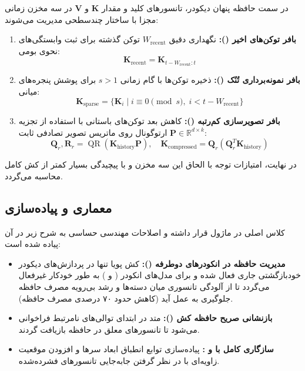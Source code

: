 در سمت حافظه پنهان دیکودر، تانسورهای کلید و مقدار $\mathbf{K}$ و $\mathbf{V}$ در سه مخزن زمانی مجزا با ساختار چندسطحی مدیریت می‌شوند:
\begin{enumerate}
    \item \textbf{بافر توکن‌های اخیر ():} نگهداری دقیق $W_{\text{recent}}$ توکن گذشته برای ثبت وابستگی‌های نحوی بومی:
    \begin{equation}
    \mathbf{K}_{\text{recent}} = \mathbf{K}_{t - W_{\text{recent}} : t}
    \end{equation}
    \item \textbf{بافر نمونه‌برداری تُنُک ():} ذخیره توکن‌ها با گام زمانی $s > 1$ برای پوشش پنجره‌های میانی:
    \begin{equation}
    \mathbf{K}_{\text{sparse}} = \{ \mathbf{K}_i \mid i \equiv 0 \pmod s, \; i < t - W_{\text{recent}} \}
    \end{equation}
    \item \textbf{بافر تصویرسازی کم‌رتبه ():} کاهش بعد توکن‌های باستانی با استفاده از تجزیه ارتوگونال  روی ماتریس تصویر تصادفی ثابت $\mathbf{P} \in \mathbb{R}^{d \times k}$:
    \begin{equation}
    \mathbf{Q}_r, \mathbf{R}_r = \operatorname{QR}(\mathbf{K}_{\text{history}} \mathbf{P}), \quad \mathbf{K}_{\text{compressed}} = \mathbf{Q}_r \left( \mathbf{Q}_r^T \mathbf{K}_{\text{history}} \right)
    \end{equation}
\end{enumerate}
در نهایت، امتیازات توجه با الحاق این سه مخزن و با پیچیدگی بسیار کمتر از کش کامل محاسبه می‌گردد.

\subsection{معماری و پیاده‌سازی}
کلاس اصلی  در ماژول  قرار داشته و اصلاحات مهندسی حساسی به شرح زیر در آن پیاده شده است:
\begin{itemize}
    \item \textbf{مدیریت حافظه در انکودرهای دوطرفه ():} کش پویا تنها در پردازش‌های دیکودر خودبازگشتی جاری فعال شده و برای مدل‌های انکودر ( و ) به طور خودکار غیرفعال می‌گردد تا از آلودگی تانسوری میان دسته‌ها و رشد بی‌رویه مصرف حافظه جلوگیری به عمل آید (کاهش حدود ۷۰ درصدی مصرف حافظه).
    \item \textbf{بازنشانی صریح حافظه کش ():} متد  در ابتدای توالی‌های نامرتبط فراخوانی می‌شود تا تانسورهای معلق در حافظه بازیافت گردند.
    \item \textbf{سازگاری کامل با  و :} پیاده‌سازی توابع انطباق ابعاد سرها و افزودن موقعیت زاویه‌ای با در نظر گرفتن جابه‌جایی تانسورهای فشرده‌شده.
\end{itemize}

